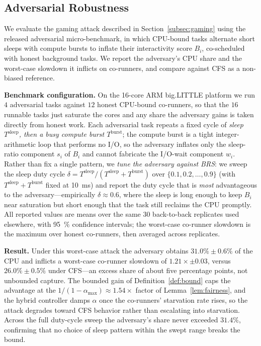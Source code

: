 \subsection{Adversarial Robustness}
\label{subsec:adversarial}
We evaluate the gaming attack described in Section~\ref{subsec:gaming} using the released adversarial micro-benchmark, in which CPU-bound tasks alternate short sleeps with compute bursts to inflate their interactivity score $B_i$, co-scheduled with honest background tasks. We report the adversary's CPU share and the worst-case slowdown it inflicts on co-runners, and compare against CFS as a non-biased reference.

\textbf{Benchmark configuration.} On the 16-core ARM big.LITTLE platform we run $4$ adversarial tasks against $12$ honest CPU-bound co-runners, so that the $16$ runnable tasks just saturate the cores and any share the adversary gains is taken directly from honest work. Each adversarial task repeats a fixed cycle of \emph{sleep $T^{\text{sleep}}$, then a busy compute burst $T^{\text{burst}}$}; the compute burst is a tight integer-arithmetic loop that performs no I/O, so the adversary inflates only the sleep-ratio component $s_i$ of $B_i$ and cannot fabricate the I/O-wait component $w_i$. Rather than fix a single pattern, we \emph{tune the adversary against BRS}: we sweep the sleep duty cycle $\delta = T^{\text{sleep}}/(T^{\text{sleep}}+T^{\text{burst}})$ over $\{0.1,0.2,\dots,0.9\}$ (with $T^{\text{sleep}}+T^{\text{burst}}$ fixed at \SI{10}{\milli\second}) and report the duty cycle that is \emph{most} advantageous to the adversary---empirically $\delta\approx0.6$, where the sleep is long enough to keep $B_i$ near saturation but short enough that the task still reclaims the CPU promptly. All reported values are means over the same \num{30} back-to-back replicates used elsewhere, with \SI{95}{\percent} confidence intervals; the worst-case co-runner slowdown is the maximum over honest co-runners, then averaged across replicates.

\textbf{Result.} Under this worst-case attack the adversary obtains $31.0\%\pm0.6\%$ of the CPU and inflicts a worst-case co-runner slowdown of $1.21\times\pm0.03$, versus $26.0\%\pm0.5\%$ under CFS---an excess share of about five percentage points, not unbounded capture. The bounded gain of Definition~\ref{def:bound} caps the advantage at the $1/(1-\alpha_{\max})\approx1.54\times$ factor of Lemma~\ref{lem:fairness}, and the hybrid controller damps $\alpha$ once the co-runners' starvation rate rises, so the attack degrades toward CFS behavior rather than escalating into starvation. Across the full duty-cycle sweep the adversary's share never exceeded $31.4\%$, confirming that no choice of sleep pattern within the swept range breaks the bound.





